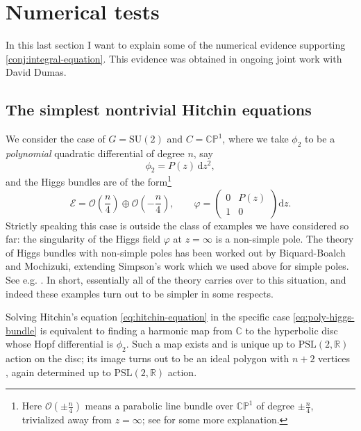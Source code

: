 \documentclass[12pt,letterpaper,reqno]{article}
\numberwithin{equation}{section}
\newcommand{\cO}{\ensuremath{\mathcal O}}
\newcommand{\R}{\ensuremath{\mathbb R}}
\newcommand{\bbC}{\ensuremath{\mathbb C}}
\newcommand{\bbP}{\ensuremath{\mathbb P}}
\newcommand{\cE}{{\mathcal E}}
\newcommand{\de}{\mathrm{d}}
\newcommand{\ti}[1]{\textit{#1}}
\newcommand{\PSL}{\mathrm{PSL}}
\newcommand{\SU}{\mathrm{SU}}
\begin{document}
\section{Numerical tests}

In this last section I want to explain some of the numerical
evidence supporting \autoref{conj:integral-equation}.
This evidence was obtained in ongoing joint work with 
David Dumas.


\subsection{The simplest nontrivial Hitchin equations}

We consider the case of $G = \SU(2)$ 
and $C = \bbC\bbP^1$, where we take $\phi_2$ to be a
\ti{polynomial} quadratic differential
of degree $n$, say
\begin{equation} \label{eq:poly-quad}
  \phi_2 = P(z) \, \de z^2,
\end{equation}
and the Higgs bundles are 
of the form\footnote{Here $\cO(\pm\frac{n}{4})$ means a parabolic line bundle 
over $\bbC\bbP^1$ of
degree $\pm \frac{n}{4}$, trivialized away from $z = \infty$; see \cite{Fredrickson2017} for some more explanation.
}
\begin{equation} \label{eq:poly-higgs-bundle}
  \cE = \cO\left(\frac{n}{4}\right) \oplus \cO\left(-\frac{n}{4}\right), \qquad \varphi = \begin{pmatrix} 0 & P(z) \\ 1 & 0 \end{pmatrix} \de z.
\end{equation}
Strictly speaking this case is outside the class of
examples we have considered so far: the singularity
of the Higgs field $\varphi$ 
at $z = \infty$ is a non-simple pole.
The theory of Higgs bundles with non-simple poles
has been worked out by Biquard-Boalch and Mochizuki, extending
Simpson's work which we used above for simple
poles. See e.g. \cite{wnh}.
In short, essentially all
of the theory carries over to this situation, and indeed
these examples turn out to be simpler in some respects.

Solving Hitchin's equation \eqref{eq:hitchin-equation} 
in the specific
case \eqref{eq:poly-higgs-bundle} is equivalent to 
finding a harmonic map from $\bbC$ to the hyperbolic disc whose  Hopf differential is $\phi_2$. Such a map exists and 
is unique up to $\PSL(2,\R)$ action on the disc; its image
turns out to be an ideal polygon with $n+2$ vertices
\cite{HTTW}, again determined up to $\PSL(2,\R)$ action.
\end{document}
